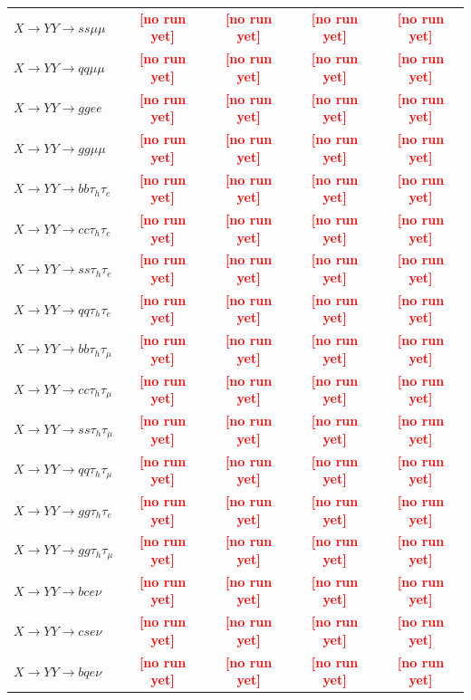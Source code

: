 \documentclass[12pt]{article}   %
\newcommand{\pending}[1]{\textcolor{red}{\textbf{[#1]}}}
\begin{document}
\begin{landscape}
{\begin{longtable}{@{\extracolsep{\fill}}lcccc@{}}
$X\to YY\to ss\mu\mu$ & \pending{no run yet} & \pending{no run yet} & \pending{no run yet} & \pending{no run yet} \\
$X\to YY\to qq\mu\mu$ & \pending{no run yet} & \pending{no run yet} & \pending{no run yet} & \pending{no run yet} \\
$X\to YY\to ggee$ & \pending{no run yet} & \pending{no run yet} & \pending{no run yet} & \pending{no run yet} \\
$X\to YY\to gg\mu\mu$ & \pending{no run yet} & \pending{no run yet} & \pending{no run yet} & \pending{no run yet} \\
\midrule
$X\to YY\to bb\tau_h\tau_e$ & \pending{no run yet} & \pending{no run yet} & \pending{no run yet} & \pending{no run yet} \\
$X\to YY\to cc\tau_h\tau_e$ & \pending{no run yet} & \pending{no run yet} & \pending{no run yet} & \pending{no run yet} \\
$X\to YY\to ss\tau_h\tau_e$ & \pending{no run yet} & \pending{no run yet} & \pending{no run yet} & \pending{no run yet} \\
$X\to YY\to qq\tau_h\tau_e$ & \pending{no run yet} & \pending{no run yet} & \pending{no run yet} & \pending{no run yet} \\
$X\to YY\to bb\tau_h\tau_\mu$ & \pending{no run yet} & \pending{no run yet} & \pending{no run yet} & \pending{no run yet} \\
$X\to YY\to cc\tau_h\tau_\mu$ & \pending{no run yet} & \pending{no run yet} & \pending{no run yet} & \pending{no run yet} \\
$X\to YY\to ss\tau_h\tau_\mu$ & \pending{no run yet} & \pending{no run yet} & \pending{no run yet} & \pending{no run yet} \\
$X\to YY\to qq\tau_h\tau_\mu$ & \pending{no run yet} & \pending{no run yet} & \pending{no run yet} & \pending{no run yet} \\
$X\to YY\to gg\tau_h\tau_e$ & \pending{no run yet} & \pending{no run yet} & \pending{no run yet} & \pending{no run yet} \\
$X\to YY\to gg\tau_h\tau_\mu$ & \pending{no run yet} & \pending{no run yet} & \pending{no run yet} & \pending{no run yet} \\
\midrule
$X\to YY\to bce\nu$ & \pending{no run yet} & \pending{no run yet} & \pending{no run yet} & \pending{no run yet} \\
$X\to YY\to cse\nu$ & \pending{no run yet} & \pending{no run yet} & \pending{no run yet} & \pending{no run yet} \\
$X\to YY\to bqe\nu$ & \pending{no run yet} & \pending{no run yet} & \pending{no run yet} & \pending{no run yet} \\

\end{longtable}}
\end{landscape}
\end{document}
